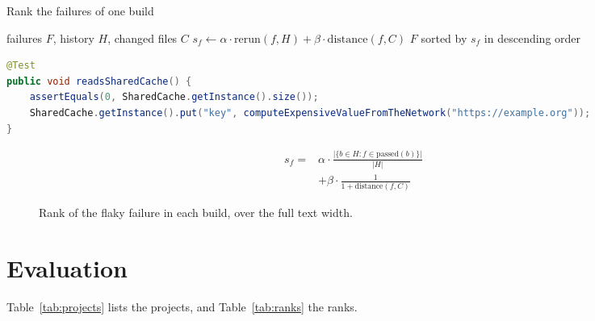 \documentclass[10pt,conference,letterpaper]{IEEEtran}
\begin{document}
\begin{algorithm}[t]
\caption{Rank the failures of one build}
\label{alg:rank}
\begin{algorithmic}[1]
\REQUIRE failures $F$, history $H$, changed files $C$
\STATE $s_f \gets \alpha \cdot \mathrm{rerun}(f, H) + \beta \cdot \mathrm{distance}(f, C)$
\ENDFOR
\RETURN $F$ sorted by $s_f$ in descending order
\end{algorithmic}
\end{algorithm}

\begin{lstlisting}[language=Java, caption={A test that depends on the order of the suite.}, label={lst:test}]
@Test
public void readsSharedCache() {
    assertEquals(0, SharedCache.getInstance().size());
    SharedCache.getInstance().put("key", computeExpensiveValueFromTheNetwork("https://example.org"));
}
\end{lstlisting}

\lipsum[7]
\begin{equation}
\begin{split}
s_f ={}& \alpha \cdot \frac{\lvert \{ b \in H : f \in \mathrm{passed}(b) \} \rvert}{\lvert H \rvert}\\
  &+ \beta \cdot \frac{1}{1 + \mathrm{distance}(f, C)}
\end{split}
\end{equation}

\begin{figure}[t]
\centering
{}
\caption{Rank of the flaky failure in each build, over the full text width.}
\label{fig:ranks}
\end{figure}

\section{Evaluation}
\lipsum[8]
Table~\ref{tab:projects} lists the projects, and Table~\ref{tab:ranks} the ranks.
\end{document}
